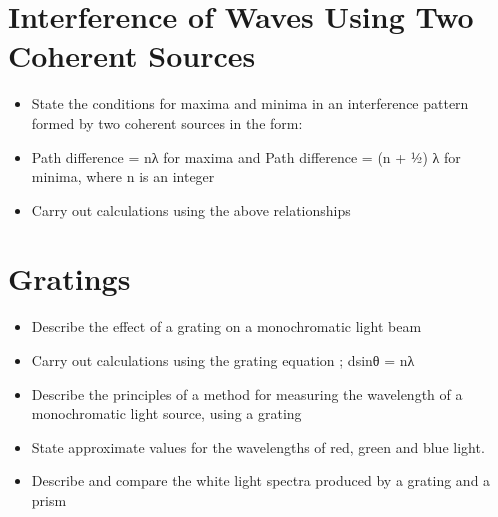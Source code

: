 \section{Interference of Waves Using Two Coherent Sources}
\begin{multicols}{2}
	\begin{itemize}
        \item State the conditions for maxima and minima in an interference
            pattern formed by two coherent sources in the form:
        \item Path difference = nλ for maxima and Path difference = (n + 1⁄2) λ for 
            minima, where n is an integer
        \item Carry out calculations using the above relationships
	\end{itemize}
\end{multicols}

\section{Gratings}
\begin{multicols}{2}
	\begin{itemize}
        \item Describe the effect of a grating on a monochromatic light beam
        \item Carry out calculations using the grating equation ;
            dsinθ = nλ
        \item Describe the principles of a method for measuring the wavelength of
            a monochromatic light source, using a grating
        \item State approximate values for the wavelengths of red, green and blue
            light.
        \item Describe and compare the white light spectra produced by a grating
            and a prism
	\end{itemize}
\end{multicols}

